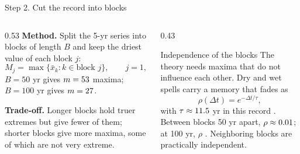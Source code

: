 \documentclass[aspectratio=169,11pt]{beamer}
\begin{document}
\begin{frame}{Step 2. Cut the record into blocks}
  \begin{columns}[T]
    \begin{column}{0.53\textwidth}\small
      \textbf{Method.} Split the 5-yr series into blocks of length $B$ and
      keep the driest value of each block $j$:
      \[
        M_j = \max\{\bar{x}_k : k \in \text{block } j\},
        \qquad j = 1, \dots, m .
      \]
      $B = 50$ yr gives $m = 53$ maxima; $B = 100$ yr gives
      $m = 27$.
      \par\medskip
      \textbf{Trade-off.} Longer blocks hold truer extremes but give fewer
      of them; shorter blocks give more maxima, some of which are not very
      extreme.
    \end{column}
    \begin{column}{0.43\textwidth}
      \begin{block}{Independence of the blocks}
        \small The theory needs maxima that do not influence each other.
        Dry and wet spells carry a memory that fades as
        \[
          \rho(\Delta t) = e^{-\Delta t/\tau},
        \]
        with $\tau \approx 11.5$ yr in this record
        \citep{Mudelsee2002}. Between blocks 50 yr apart,
        $\rho \approx 0.01$; at 100 yr, $\rho$ \nRhoHundred.
        \alert{Neighboring blocks are practically independent.}
      \end{block}
    \end{column}
  \end{columns}
\end{frame}
\end{document}
